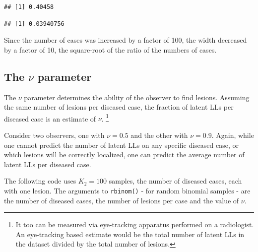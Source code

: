 \documentclass[
]{book}
\newenvironment{Shaded}{\begin{snugshade}}{\end{snugshade}}
\newcommand{\DecValTok}[1]{\textcolor[rgb]{0.00,0.00,0.81}{#1}}
\newcommand{\NormalTok}[1]{#1}
\newcommand{\OperatorTok}[1]{\textcolor[rgb]{0.81,0.36,0.00}{\textbf{#1}}}
\newcommand{\StringTok}[1]{\textcolor[rgb]{0.31,0.60,0.02}{#1}}
\begin{document}
\begin{Shaded}
\end{Shaded}

\begin{verbatim}
## [1] 0.40458
\end{verbatim}

\begin{Shaded}
\end{Shaded}

\begin{verbatim}
## [1] 0.03940756
\end{verbatim}

Since the number of cases was increased by a factor of 100, the width decreased by a factor of 10, the square-root of the ratio of the numbers of cases.

\hypertarget{rsm-summary-nu-parameter}{%
\subsection{\texorpdfstring{The \(\nu\) parameter}{The \textbackslash nu parameter}}\label{rsm-summary-nu-parameter}}

The \(\nu\) parameter determines the ability of the observer to find lesions. Assuming the same number of lesions per diseased case, the fraction of latent LLs per diseased case is an estimate of \(\nu\). \footnote{It too can be measured via eye-tracking apparatus performed on a radiologist. An eye-tracking based estimate would be the total number of latent LLs in the dataset divided by the total number of lesions.}

Consider two observers, one with \(\nu = 0.5\) and the other with \(\nu = 0.9\). Again, while one cannot predict the number of latent LLs on any specific diseased case, or which lesions will be correctly localized, one can predict the average number of latent LLs per diseased case.

The following code uses \(K_2 = 100\) samples, the number of diseased cases, each with one lesion. The arguments to \texttt{rbinom()} - for random binomial samples - are the number of diseased cases, the number of lesions per case and the value of \(\nu\).
\end{document}
